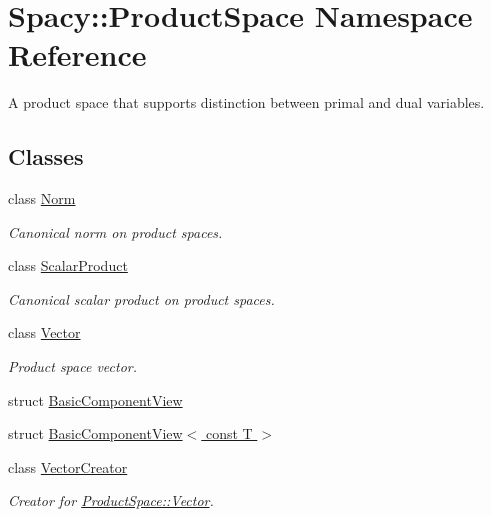 \hypertarget{namespaceSpacy_1_1ProductSpace}{\section{Spacy\-:\-:Product\-Space Namespace Reference}
\label{namespaceSpacy_1_1ProductSpace}
}


A product space that supports distinction between primal and dual variables.  


\subsection*{Classes}
\begin{DoxyCompactItemize}
\item 
class \hyperlink{classSpacy_1_1ProductSpace_1_1Norm}{Norm}
\begin{DoxyCompactList}\small\item\em Canonical norm on product spaces. \end{DoxyCompactList}\item 
class \hyperlink{classSpacy_1_1ProductSpace_1_1ScalarProduct}{Scalar\-Product}
\begin{DoxyCompactList}\small\item\em Canonical scalar product on product spaces. \end{DoxyCompactList}\item 
class \hyperlink{classSpacy_1_1ProductSpace_1_1Vector}{Vector}
\begin{DoxyCompactList}\small\item\em Product space vector. \end{DoxyCompactList}\item 
struct \hyperlink{structSpacy_1_1ProductSpace_1_1BasicComponentView}{Basic\-Component\-View}
\item 
struct \hyperlink{structSpacy_1_1ProductSpace_1_1BasicComponentView_3_01const_01T_01_4}{Basic\-Component\-View$<$ const T $>$}
\item 
class \hyperlink{classSpacy_1_1ProductSpace_1_1VectorCreator}{Vector\-Creator}
\begin{DoxyCompactList}\small\item\em Creator for \hyperlink{classSpacy_1_1ProductSpace_1_1Vector}{Product\-Space\-::\-Vector}. \end{DoxyCompactList}\end{DoxyCompactItemize}
